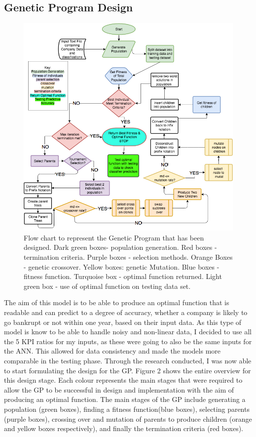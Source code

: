 \documentclass[11pt]{article}
\begin{document}
\subsection{Genetic Program Design}
\begin{figure}[h]
\centering
\includegraphics[scale = .45]{GPFlowReformat} 
\caption{Flow chart to represent the Genetic Program that has been designed. Dark green boxes- population generation. Red boxes - termination criteria. Purple boxes - selection methods. Orange Boxes - genetic crossover. Yellow boxes: genetic Mutation. Blue boxes - fitness function. Turquoise box - optimal function returned. Light green box - use of optimal function on testing data set.} 
\end{figure}
The aim of this model is to be able to produce an optimal function that is readable and can predict to a degree of accuracy, whether a company is likely to go bankrupt or not within one year, based on their input data. As this type of model is know to be able to handle noisy and non-linear data, I decided to use all the 5 KPI ratios for my inputs, as these were going to also be the same inputs for the ANN. This allowed for data consistency and made the models more comparable in the testing phase. Through the research conducted, I was now able to start formulating the design for the GP.  Figure 2 shows the entire overview for this design stage. Each colour represents the main stages that were required to allow the GP to be successful in design and implementation with the aim of producing an optimal function.  The main stages of the GP include generating a population (green boxes), finding a fitness function(blue boxes), selecting parents (purple boxes), crossing over and mutation of parents to produce children (orange and yellow boxes respectively), and finally the termination criteria (red boxes). 
\end{document}
